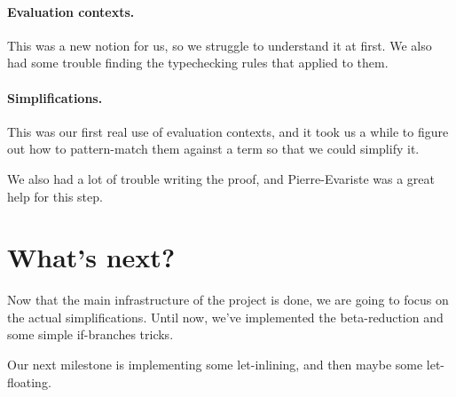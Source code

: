 \documentclass{article}
\begin{document}
\paragraph{Evaluation contexts.}This was a new notion for us, so we struggle to understand it at first.
We also had some trouble finding the typechecking rules that applied to them.

\paragraph{Simplifications.}This was our first real use of evaluation contexts, and it took us 
a while to figure out how to pattern-match them against a term so that we could simplify it.

We also had a lot of trouble writing the proof, and Pierre-Evariste was a great help for this step.


\section{What's next?}
Now that the main infrastructure of the project is done, we are going to focus on the actual simplifications.
Until now, we've implemented the beta-reduction and some simple if-branches tricks.

Our next milestone is implementing some let-inlining, and then maybe some let-floating.
\end{document}
